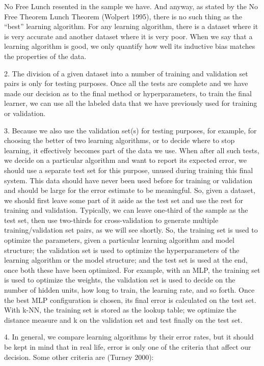 No Free Lunch resented in the sample we have. And anyway, as stated by the No Free Theorem Lunch Theorem (Wolpert 1995), there is no such thing as the “best” learning algorithm. For any learning algorithm, there is a dataset where it is very accurate and another dataset where it is very poor. When we say that a learning algorithm is good, we only quantify how well its inductive bias matches the properties of the data.

2. The division of a given dataset into a number of training and validation set pairs is only for testing purposes. Once all the tests are complete and we have made our decision as to the final method or hyperparameters, to train the final learner, we can use all the labeled data that we have previously used for training or validation.

3. Because we also use the validation set(s) for testing purposes, for example, for choosing the better of two learning algorithms, or to decide where to stop learning, it effectively becomes part of the data we use. When after all such tests, we decide on a particular algorithm and want to report its expected error, we should use a separate test set for this purpose, unused during training this final system. This data should have never been used before for training or validation and should be large for the error estimate to be meaningful. So, given a dataset, we should first leave some part of it aside as the test set and use the rest for training and validation. Typically, we can leave one-third of the sample as the test set, then use two-thirds for cross-validation to generate multiple training/validation set pairs, as we will see shortly. So, the training set is used to optimize the parameters, given a particular learning algorithm and model structure; the validation set is used to optimize the hyperparameters of the learning algorithm or the model structure; and the test set is used at the end, once both these have been optimized. For example, with an MLP, the training set is used to optimize the weights, the validation set is used to decide on the number of hidden units, how long to train, the learning rate, and so forth. Once the best MLP configuration is chosen, its final error is calculated on the test set. With k-NN, the training set is stored as the lookup table; we optimize the distance measure and k on the validation set and test finally on the test set.

4. In general, we compare learning algorithms by their error rates, but it should be kept in mind that in real life, error is only one of the criteria that affect our decision. Some other criteria are (Turney 2000):

